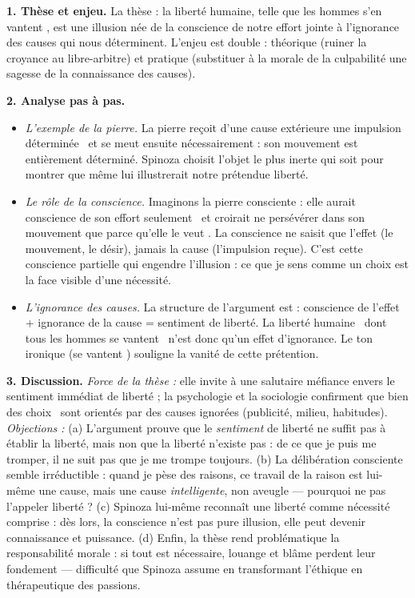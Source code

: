 \documentclass[11pt]{article}
\begin{document}
\begin{corrige}
\textbf{1. Thèse et enjeu.} La thèse : la liberté humaine, telle que les hommes s'en \guillemotleft vantent \guillemotright, est une illusion née de la conscience de notre effort jointe à l'ignorance des causes qui nous déterminent. L'enjeu est double : théorique (ruiner la croyance au libre-arbitre) et pratique (substituer à la morale de la culpabilité une sagesse de la connaissance des causes).

\textbf{2. Analyse pas à pas.}
\begin{itemize}
\item \emph{L'exemple de la pierre.} La pierre reçoit \guillemotleft d'une cause extérieure une impulsion déterminée \guillemotright\ et \guillemotleft se meut ensuite nécessairement \guillemotright : son mouvement est entièrement déterminé. Spinoza choisit l'objet le plus inerte qui soit pour montrer que même lui illustrerait notre prétendue liberté.
\item \emph{Le rôle de la conscience.} Imaginons la pierre consciente : elle aurait \guillemotleft conscience de son effort seulement \guillemotright\ et croirait \guillemotleft ne persévérer dans son mouvement que parce qu'elle le veut \guillemotright. La conscience ne saisit que l'effet (le mouvement, le désir), jamais la cause (l'impulsion reçue). C'est cette conscience partielle qui engendre l'illusion : ce que je sens comme un choix est la face visible d'une nécessité.
\item \emph{L'ignorance des causes.} La structure de l'argument est : conscience de l'effet + ignorance de la cause = sentiment de liberté. La \guillemotleft liberté humaine \guillemotright\ dont \guillemotleft tous les hommes se vantent \guillemotright\ n'est donc qu'un effet d'ignorance. Le ton ironique (\guillemotleft se vantent \guillemotright) souligne la vanité de cette prétention.
\end{itemize}

\textbf{3. Discussion.} \emph{Force de la thèse :} elle invite à une salutaire méfiance envers le sentiment immédiat de liberté ; la psychologie et la sociologie confirment que bien des \guillemotleft choix \guillemotright\ sont orientés par des causes ignorées (publicité, milieu, habitudes). \emph{Objections :} (a) L'argument prouve que le \emph{sentiment} de liberté ne suffit pas à établir la liberté, mais non que la liberté n'existe pas : de ce que je puis me tromper, il ne suit pas que je me trompe toujours. (b) La délibération consciente semble irréductible : quand je pèse des raisons, ce travail de la raison est lui-même une cause, mais une cause \emph{intelligente}, non aveugle — pourquoi ne pas l'appeler liberté ? (c) Spinoza lui-même reconnaît une liberté comme \guillemotleft nécessité comprise \guillemotright : dès lors, la conscience n'est pas pure illusion, elle peut devenir connaissance et puissance. (d) Enfin, la thèse rend problématique la responsabilité morale : si tout est nécessaire, louange et blâme perdent leur fondement — difficulté que Spinoza assume en transformant l'éthique en thérapeutique des passions.


\end{corrige}
\end{document}
